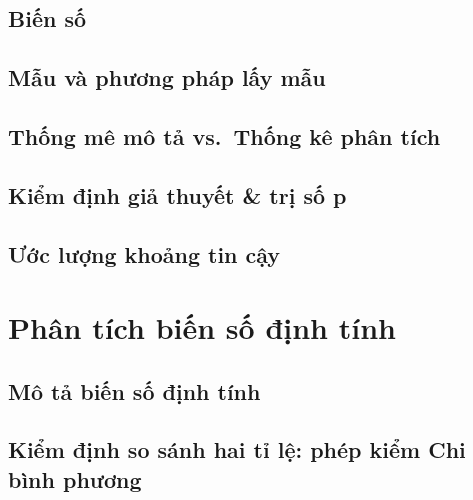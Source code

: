 \documentclass[
]{book}
\begin{document}
\hypertarget{biux1ebfn-sux1ed1}{%
\subsection{Biến số}\label{biux1ebfn-sux1ed1}}

\hypertarget{mux1eabu-vuxe0-phux1b0ux1a1ng-phuxe1p-lux1ea5y-mux1eabu}{%
\subsection{Mẫu và phương pháp lấy mẫu}\label{mux1eabu-vuxe0-phux1b0ux1a1ng-phuxe1p-lux1ea5y-mux1eabu}}

\hypertarget{thux1ed1ng-muxea-muxf4-tux1ea3-vs.-thux1ed1ng-kuxea-phuxe2n-tuxedch}{%
\subsection{Thống mê mô tả vs.~Thống kê phân tích}\label{thux1ed1ng-muxea-muxf4-tux1ea3-vs.-thux1ed1ng-kuxea-phuxe2n-tuxedch}}

\hypertarget{kiux1ec3m-ux111ux1ecbnh-giux1ea3-thuyux1ebft-trux1ecb-sux1ed1-p}{%
\subsection{Kiểm định giả thuyết \& trị số p}\label{kiux1ec3m-ux111ux1ecbnh-giux1ea3-thuyux1ebft-trux1ecb-sux1ed1-p}}

\hypertarget{ux1b0ux1edbc-lux1b0ux1ee3ng-khoux1ea3ng-tin-cux1eady}{%
\subsection{Ước lượng khoảng tin cậy}\label{ux1b0ux1edbc-lux1b0ux1ee3ng-khoux1ea3ng-tin-cux1eady}}

\hypertarget{phuxe2n-tuxedch-biux1ebfn-sux1ed1-ux111ux1ecbnh-tuxednh}{%
\section{Phân tích biến số định tính}\label{phuxe2n-tuxedch-biux1ebfn-sux1ed1-ux111ux1ecbnh-tuxednh}}

\hypertarget{muxf4-tux1ea3-biux1ebfn-sux1ed1-ux111ux1ecbnh-tuxednh}{%
\subsection{Mô tả biến số định tính}\label{muxf4-tux1ea3-biux1ebfn-sux1ed1-ux111ux1ecbnh-tuxednh}}

\hypertarget{kiux1ec3m-ux111ux1ecbnh-so-suxe1nh-hai-tux1ec9-lux1ec7-phuxe9p-kiux1ec3m-chi-buxecnh-phux1b0ux1a1ng}{%
\subsection{Kiểm định so sánh hai tỉ lệ: phép kiểm Chi bình phương}\label{kiux1ec3m-ux111ux1ecbnh-so-suxe1nh-hai-tux1ec9-lux1ec7-phuxe9p-kiux1ec3m-chi-buxecnh-phux1b0ux1a1ng}}
\end{document}
